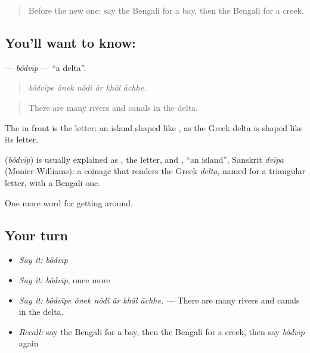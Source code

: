\label{lesson:BN-C431-bodvip}



\begin{quote}
Before the new one: say the Bengali for a bay, then the Bengali for a creek.
\end{quote}

\subsection*{You'll want to know: }
\textbf{} — \emph{bôdvīp} — \textquotedblleft{}a delta\textquotedblright{}.

\begin{quote}
     
\end{quote}

\begin{quote}
\emph{bôdvīpe ônek nôdī ār khāl āchhe.}
\end{quote}

\begin{quote}
There are many rivers and canals in the delta.
\end{quote}

The  in front is the letter: an island shaped like , as the Greek delta is shaped like its letter.

\begin{cousinweb}
\textbf{} (\emph{bôdvīp}) is usually explained as , the letter, and \textbf{}, \textquotedblleft{}an island\textquotedblright{}, Sanskrit \emph{dvīpa} (Monier-Williams): a coinage that renders the Greek \emph{delta}, named for a triangular letter, with a Bengali one.
\end{cousinweb}

\begin{grammarlens}[title={What you've built}]
One more word for getting around.
\end{grammarlens}

\subsection*{Your turn}
\begin{itemize}
\raggedright
  \item \emph{Say it:} \emph{bôdvīp}
  \item \emph{Say it:} \emph{bôdvīp}, once more
  \item \emph{Say it:} \emph{bôdvīpe ônek nôdī ār khāl āchhe.} — There are many rivers and canals in the delta.
  \item \emph{Recall:} say the Bengali for a bay, then the Bengali for a creek, then say \emph{bôdvīp} again
\end{itemize}

